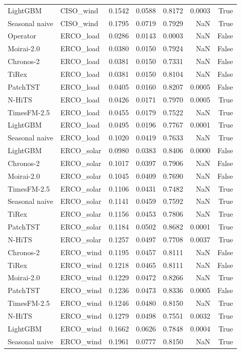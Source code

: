 \begin{tabular}{llrrrrr}
LightGBM & CISO_wind & 0.1542 & 0.0588 & 0.8172 & 0.0003 & True \\
Seasonal naive & CISO_wind & 0.1795 & 0.0719 & 0.7929 & NaN & True \\
Operator & ERCO_load & 0.0286 & 0.0143 & 0.0003 & NaN & False \\
Moirai-2.0 & ERCO_load & 0.0380 & 0.0150 & 0.7924 & NaN & False \\
Chronos-2 & ERCO_load & 0.0381 & 0.0150 & 0.7331 & NaN & False \\
TiRex & ERCO_load & 0.0381 & 0.0150 & 0.8104 & NaN & False \\
PatchTST & ERCO_load & 0.0405 & 0.0160 & 0.8207 & 0.0005 & False \\
N-HiTS & ERCO_load & 0.0426 & 0.0171 & 0.7970 & 0.0005 & True \\
TimesFM-2.5 & ERCO_load & 0.0455 & 0.0179 & 0.7522 & NaN & True \\
LightGBM & ERCO_load & 0.0495 & 0.0196 & 0.7767 & 0.0001 & True \\
Seasonal naive & ERCO_load & 0.1020 & 0.0419 & 0.7633 & NaN & True \\
LightGBM & ERCO_solar & 0.0980 & 0.0383 & 0.8406 & 0.0000 & False \\
Chronos-2 & ERCO_solar & 0.1017 & 0.0397 & 0.7906 & NaN & False \\
Moirai-2.0 & ERCO_solar & 0.1045 & 0.0409 & 0.7690 & NaN & False \\
TimesFM-2.5 & ERCO_solar & 0.1106 & 0.0431 & 0.7482 & NaN & True \\
Seasonal naive & ERCO_solar & 0.1141 & 0.0459 & 0.7592 & NaN & True \\
TiRex & ERCO_solar & 0.1156 & 0.0453 & 0.7806 & NaN & True \\
PatchTST & ERCO_solar & 0.1184 & 0.0502 & 0.8682 & 0.0001 & True \\
N-HiTS & ERCO_solar & 0.1257 & 0.0497 & 0.7708 & 0.0037 & True \\
Chronos-2 & ERCO_wind & 0.1195 & 0.0457 & 0.8111 & NaN & False \\
TiRex & ERCO_wind & 0.1218 & 0.0465 & 0.8111 & NaN & False \\
Moirai-2.0 & ERCO_wind & 0.1229 & 0.0472 & 0.8266 & NaN & True \\
PatchTST & ERCO_wind & 0.1236 & 0.0473 & 0.8336 & 0.0005 & False \\
TimesFM-2.5 & ERCO_wind & 0.1246 & 0.0480 & 0.8150 & NaN & True \\
N-HiTS & ERCO_wind & 0.1279 & 0.0498 & 0.7551 & 0.0032 & True \\
LightGBM & ERCO_wind & 0.1662 & 0.0626 & 0.7848 & 0.0004 & True \\
Seasonal naive & ERCO_wind & 0.1961 & 0.0777 & 0.8150 & NaN & True \\
\bottomrule
\end{tabular}
